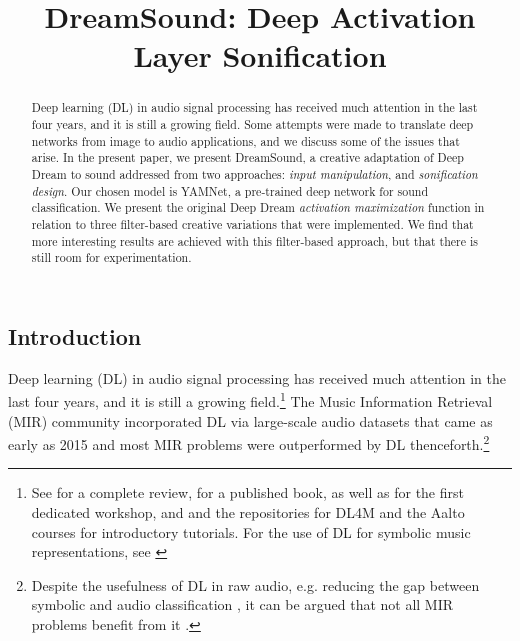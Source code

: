 \documentclass[a4paper,10pt,oneside]{article}
\title{DreamSound: Deep Activation Layer Sonification}
\begin{document}
\ninept
\maketitle

\begin{sloppy}
\begin{abstract}
Deep learning (DL) in audio signal processing has received much attention in the last four years, and it is still a growing field.
Some attempts were made to translate deep networks from image to audio applications, and we discuss some of the issues that arise.
In the present paper, we present DreamSound, a creative adaptation of Deep Dream to sound addressed from two approaches: \textit{input manipulation}, and \textit{sonification design}. Our chosen model is YAMNet, a pre-trained deep network for sound classification. We present the original Deep Dream \textit{activation maximization} function in relation to three filter-based creative variations that were implemented. We find that more interesting results are achieved with this filter-based approach, but that there is still room for experimentation. 

\end{abstract}

\section{Introduction}
\label{sec:intro}

Deep learning (DL) in audio signal processing has received much attention in the last four years, and it is still a growing field.\footnote{See \cite{2019Purwins} for a complete review, \cite{Briot2017} for a published book, as well as \cite{herremans2017proceedings} for the first dedicated workshop, and \cite{choi2017tutorial} and the repositories for DL4M \cite{Bayle2017} and the Aalto courses \cite{Koray2018} for introductory tutorials. For the use of DL for symbolic music representations, see \cite{yang2017midinet, Briot2018AnET, rachel_manzelli_2018_1492375, hao_wen_dong_2018_1492377, mittal2021symbolic, MuseGanPapers}}  The Music Information Retrieval (MIR) community incorporated DL via large-scale audio datasets that came as early as 2015 \cite{2015piczak,2017audioset,engel2017neural} and most MIR problems were outperformed by DL thenceforth.\footnote{Despite the usefulness of DL in raw audio, e.g. reducing the gap between symbolic and audio classification \cite{sergio_oramas_2017_1417427}, it can be argued that not all MIR problems benefit from it \cite{harsh_verma_2019_3527866}.} 


\end{sloppy}
\end{document}
